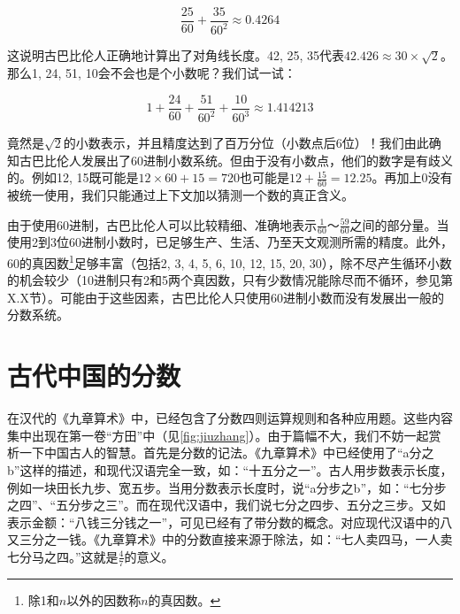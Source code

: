 \documentclass[b5paper]{ctexart}
\begin{document}
\[
\frac{25}{60} + \frac{35}{60^2} \approx 0.4264
\]

这说明古巴比伦人正确地计算出了对角线长度。42, 25, 35代表$42.426 \approx 30 \times \sqrt{2}$。那么1, 24, 51, 10会不会也是个小数呢？我们试一试：

\[
1 + \frac{24}{60} + \frac{51}{60^2} + \frac{10}{60^3} \approx 1.414213
\]

竟然是$\sqrt{2}$的小数表示，并且精度达到了百万分位（小数点后6位）！我们由此确知古巴比伦人发展出了60进制小数系统。但由于没有小数点，他们的数字是有歧义的。例如12, 15既可能是$12 \times 60 + 15 = 720$也可能是$12 + \frac{15}{60} = 12.25$。再加上0没有被统一使用，我们只能通过上下文加以猜测一个数的真正含义。

由于使用60进制，古巴比伦人可以比较精细、准确地表示$\frac{1}{60}$～$\frac{59}{60}$之间的部分量。当使用2到3位60进制小数时，已足够生产、生活、乃至天文观测所需的精度。此外，60的真因数\footnote{除1和$n$以外的因数称$n$的真因数。}足够丰富（包括2, 3, 4, 5, 6, 10, 12, 15, 20, 30），除不尽产生循环小数的机会较少（10进制只有2和5两个真因数，只有少数情况能除尽而不循环，参见第X.X节）。可能由于这些因素，古巴比伦人只使用60进制小数而没有发展出一般的分数系统。

\section{古代中国的分数}
\label{sec:chinese-fractions}

在汉代的《九章算术》中，已经包含了分数四则运算规则和各种应用题。这些内容集中出现在第一卷“方田”中（见\cref{fig:jiuzhang}）。由于篇幅不大，我们不妨一起赏析一下中国古人的智慧。首先是分数的记法。《九章算术》中已经使用了“a分之b”这样的描述，和现代汉语完全一致，如：“十五分之一”。古人用步数表示长度，例如一块田长九步、宽五步。当用分数表示长度时，说“a分步之b”，如：“七分步之四”、“五分步之三”。而在现代汉语中，我们说七分之四步、五分之三步。又如表示金额：“八钱三分钱之一”，可见已经有了带分数的概念。对应现代汉语中的八又三分之一钱。《九章算术》中的分数直接来源于除法，如：“七人卖四马，一人卖七分马之四。”这就是$\frac{4}{7}$的意义。
\end{document}
